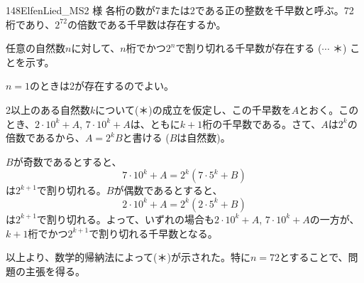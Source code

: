 \begin{prob}{148}{}{ElfenLied\_MS2 様}
 各桁の数が7または2である正の整数を千早数と呼ぶ。72桁であり、$2^{72}$の倍数である千早数は存在するか。
\end{prob}
任意の自然数$n$に対して、$n$桁でかつ$2^n$で割り切れる千早数が存在する ($\cdots$ ＊) ことを示す。

$n=1$のときは2が存在するのでよい。

2以上のある自然数$k$について(＊)の成立を仮定し、この千早数を$A$とおく。このとき、$2\cdot 10^k+A$, $7\cdot 10^k+A$は、ともに$k+1$桁の千早数である。さて、$A$は$2^k$の倍数であるから、$A=2^kB$と書ける ($B$は自然数)。

$B$が奇数であるとすると、
\[ 7\cdot 10^k+A=2^k(7\cdot 5^k+B) \]
は$2^{k+1}$で割り切れる。$B$が偶数であるとすると、
\[ 2\cdot 10^k+A=2^k(2\cdot 5^k+B) \]
は$2^{k+1}$で割り切れる。よって、いずれの場合も$2\cdot10^k+A$, $7\cdot 10^k+A$の一方が、$k+1$桁でかつ$2^{k+1}$で割り切れる千早数となる。

以上より、数学的帰納法によって(＊)が示された。特に$n=72$とすることで、問題の主張を得る。